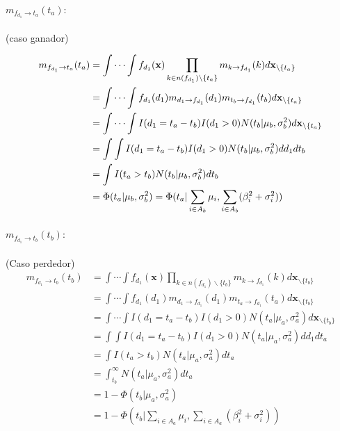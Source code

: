 \documentclass[11pt,twoside, spanish]{report} %
\begin{document}
\paragraph{$m_{f_{d_1}\rightarrow t_a}(t_a):$} (caso ganador)

\begin{equation}
	\centering
	\begin{split}
		m_{f_{d_1}\rightarrow t_a}(t_a) & = \int\cdots\int f_{d_1}(\textbf{x})\prod_{k\in n(f_{d_1})\backslash\{t_a\}} m_{k\rightarrow f_{d_1}}(k)d\textbf{x}_{\backslash \{t_a\}} \\
		& = \int\cdots\int f_{d_1}(d_1)m_{d_1\rightarrow f_{d_1}}(d_1)m_{t_b\rightarrow f_{d_1}}(t_b)d\textbf{x}_{\backslash\{t_a\}}\\
		& = \int\cdots\int I(d_1=t_a-t_b)I(d_1>0)N(t_b \vert \mu_b,\sigma_b^2)d\textbf{x}_{\backslash\{t_a\}}\\
		& =\int\int  I(d_1=t_a-t_b)I(d_1>0)N(t_b \vert \mu_b,\sigma_b^2)dd_1dt_b\\
		& =\int I(t_a>t_b)N(t_b \vert \mu_b,\sigma_b^2)dt_b\\
		& = \Phi(t_a \vert \mu_b,\sigma_b^2)=  \Phi(t_a \vert \sum_{i\in A_b}\mu_i,\sum_{i\in A_b}(\beta_i^2+\sigma_i^2))
	\end{split}
\end{equation}



\paragraph{$m_{f_{d_1} \rightarrow t_b}(t_b):$} (Caso perdedor)
\begin{equation}
	\begin{split}
		m_{f_{d_1}\rightarrow t_b}(t_b) & = \int\cdots\int f_{d_1}(\textbf{x})\prod_{k\in n(f_{d_1})\backslash\{t_b\}} m_{k\rightarrow f_{d_1}}(k)d\textbf{x}_{\backslash \{t_b\}} \\
		& = \int\cdots\int f_{d_1}(d_1)m_{d_1\rightarrow f_{d_1}}(d_1)m_{t_a\rightarrow f_{d_1}}(t_a)d\textbf{x}_{\backslash\{t_b\}}\\
		& = \int\cdots\int I(d_1=t_a-t_b)I(d_1>0)N(t_a \vert \mu_a,\sigma_a^2)d\textbf{x}_{\backslash\{t_b\}}\\
		& =\int\int  I(d_1=t_a-t_b)I(d_1>0)N(t_a \vert \mu_a,\sigma_a^2)dd_1dt_a\\
		& =\int I(t_a>t_b)N(t_a \vert \mu_a,\sigma_a^2)dt_a\\
		& =\int_{t_b}^{\infty}N(t_a \vert \mu_a,\sigma_a^2)dt_a\\
		& = 1 - \Phi(t_b \vert \mu_a,\sigma_a^2) \\
		& =  1- \Phi(t_b \vert \sum_{i\in A_a}\mu_i,\sum_{i\in A_a}(\beta_i^2+\sigma_i^2))
	\end{split}
\end{equation}
\end{document}

